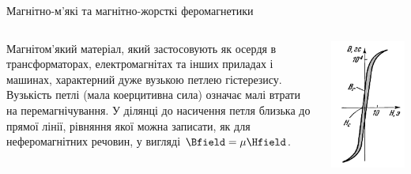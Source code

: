 \documentclass[onlytextwidth]{beamer}
\begin{document}
\begin{frame}{Магнітно-м'які та магнітно-жорсткі феромагнетики}{}
	\begin{columns}
		\begin{column}{0.75\linewidth}
			\begin{block}{}\justifying\small
				\alert{Магнітом'який} матеріал, який застосовують як осердя в трансформаторах, електромагнітах та інших приладах і машинах,
				характерний дуже вузькою петлею гістерезису. Вузькість петлі (мала коерцитивна сила) означає малі втрати на перемагнічування. У
				ділянці до насичення петля близька до прямої лінії, рівняння якої можна записати, як для неферомагнітних речовин, у вигляді $\Bfield
				= \mu\Hfield$.
			\end{block}
		\end{column}
		\begin{column}{0.25\linewidth}\centering
			\includegraphics[width=0.8\linewidth]{Soft}

\end{column}
\end{columns}
\end{frame}
\end{document}
